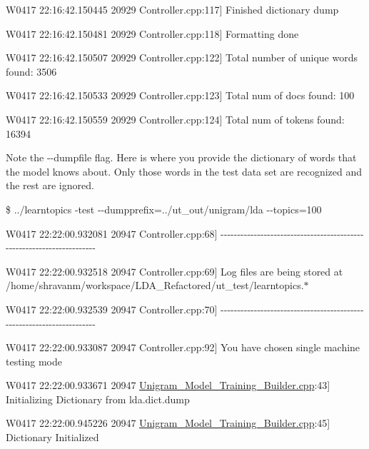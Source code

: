 {\ttfamily W0417 22:16:42.150445 20929 Controller.cpp:117\mbox{]} Finished dictionary dump  }

{\ttfamily W0417 22:16:42.150481 20929 Controller.cpp:118\mbox{]} Formatting done  }

{\ttfamily W0417 22:16:42.150507 20929 Controller.cpp:122\mbox{]} Total number of unique words found: 3506  }

{\ttfamily W0417 22:16:42.150533 20929 Controller.cpp:123\mbox{]} Total num of docs found: 100  }

{\ttfamily W0417 22:16:42.150559 20929 Controller.cpp:124\mbox{]} Total num of tokens found: 16394  } 

Note the -\/-\/dumpfile flag. Here is where you provide the dictionary of words that the model knows about. Only those words in the test data set are recognized and the rest are ignored. 

\par
  {\ttfamily  }

{\ttfamily \$ ../learntopics -\/test -\/-\/dumpprefix=../ut\_\-out/unigram/lda -\/-\/topics=100 }

{\ttfamily W0417 22:22:00.932081 20947 Controller.cpp:68\mbox{]} -\/-\/-\/-\/-\/-\/-\/-\/-\/-\/-\/-\/-\/-\/-\/-\/-\/-\/-\/-\/-\/-\/-\/-\/-\/-\/-\/-\/-\/-\/-\/-\/-\/-\/-\/-\/-\/-\/-\/-\/-\/-\/-\/-\/-\/-\/-\/-\/-\/-\/-\/-\/-\/-\/-\/-\/-\/-\/-\/-\/-\/-\/-\/-\/-\/-\/-\/-\/-\/-\/}

{\ttfamily   }

{\ttfamily W0417 22:22:00.932518 20947 Controller.cpp:69\mbox{]} Log files are being stored at /home/shravanm/workspace/LDA\_\-Refactored/ut\_\-test/learntopics.$\ast$  }

{\ttfamily W0417 22:22:00.932539 20947 Controller.cpp:70\mbox{]} -\/-\/-\/-\/-\/-\/-\/-\/-\/-\/-\/-\/-\/-\/-\/-\/-\/-\/-\/-\/-\/-\/-\/-\/-\/-\/-\/-\/-\/-\/-\/-\/-\/-\/-\/-\/-\/-\/-\/-\/-\/-\/-\/-\/-\/-\/-\/-\/-\/-\/-\/-\/-\/-\/-\/-\/-\/-\/-\/-\/-\/-\/-\/-\/-\/-\/-\/-\/-\/-\/}

{\ttfamily   }

{\ttfamily W0417 22:22:00.933087 20947 Controller.cpp:92\mbox{]} You have chosen single machine testing mode  }

{\ttfamily W0417 22:22:00.933671 20947 \hyperlink{_unigram___model___training___builder_8cpp}{Unigram\_\-Model\_\-Training\_\-Builder.cpp}:43\mbox{]} Initializing Dictionary from lda.dict.dump  }

{\ttfamily W0417 22:22:00.945226 20947 \hyperlink{_unigram___model___training___builder_8cpp}{Unigram\_\-Model\_\-Training\_\-Builder.cpp}:45\mbox{]} Dictionary Initialized  }

